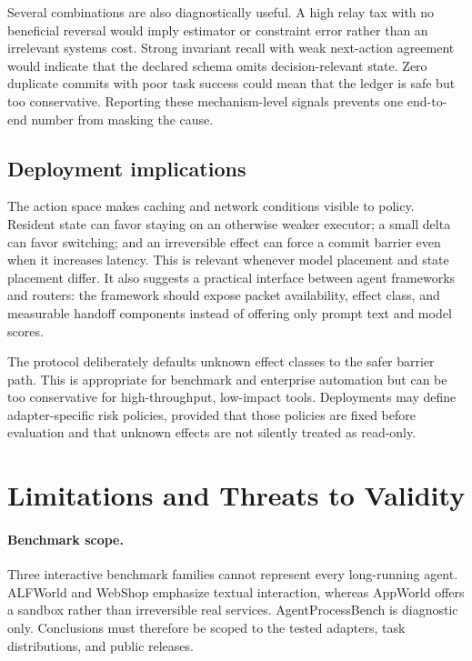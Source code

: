 \documentclass[10pt]{article}
\begin{document}
Several combinations are also diagnostically useful. A high relay tax with no
beneficial reversal would imply estimator or constraint error rather than an
irrelevant systems cost. Strong invariant recall with weak next-action
agreement would indicate that the declared schema omits decision-relevant
state. Zero duplicate commits with poor task success could mean that the
ledger is safe but too conservative. Reporting these mechanism-level signals
prevents one end-to-end number from masking the cause.

\subsection{Deployment implications}

The action space makes caching and network conditions visible to policy.
Resident state can favor staying on an otherwise weaker executor; a small
delta can favor switching; and an irreversible effect can force a commit
barrier even when it increases latency. This is relevant whenever model
placement and state placement differ. It also suggests a practical interface
between agent frameworks and routers: the framework should expose packet
availability, effect class, and measurable handoff components instead of
offering only prompt text and model scores.

The protocol deliberately defaults unknown effect classes to the safer
barrier path. This is appropriate for benchmark and enterprise automation but
can be too conservative for high-throughput, low-impact tools. Deployments
may define adapter-specific risk policies, provided that those policies are
fixed before evaluation and that unknown effects are not silently treated as
read-only.

\section{Limitations and Threats to Validity}
\label{sec:limitations}

\paragraph{Benchmark scope.}
Three interactive benchmark families cannot represent every long-running
agent. ALFWorld and WebShop emphasize textual interaction, whereas AppWorld
offers a sandbox rather than irreversible real services. AgentProcessBench is
diagnostic only. Conclusions must therefore be scoped to the tested adapters,
task distributions, and public releases.
\end{document}
